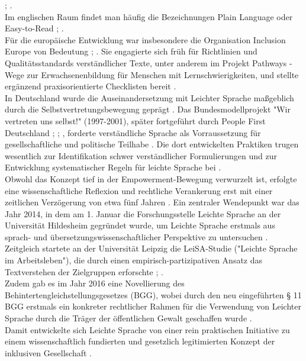 \cite[S. 251-252]{maas_handbuch_2018}; \cite[S. 18]{maas_leichte_2015}.\\
Im englischen Raum findet man häufig die Bezeichnungen Plain Language oder Easy-to-Read \cite[S. 251-252]{maas_handbuch_2018}; \cite{DINSPEC334292019}.\\
Für die europäische Entwicklung war insbesondere die Organisation Inclusion Europe von Bedeutung \cite[S. 252]{maas_handbuch_2018}; \cite[S. 18-19]{maas_leichte_2015}.
Sie engagierte sich früh für Richtlinien und Qualitätsstandards verständlicher Texte, unter anderem im Projekt Pathways - Wege zur Erwachsenenbildung für Menschen mit Lernschwierigkeiten, und stellte ergänzend praxisorientierte Checklisten bereit \cite[S. 18-20]{maas_leichte_2015}.\\
In Deutschland wurde die Auseinandersetzung mit Leichter Sprache maßgeblich durch die Selbstvertretungsbewegung geprägt \cite[S. 18-20]{maas_leichte_2015}.
Das Bundesmodellprojekt "Wir vertreten uns selbst!" (1997-2001), später fortgeführt durch People First Deutschland \cite[S. 18-20]{maas_leichte_2015}; \cite{menschzuerst_verein_2025}; \cite[S. 223]{maas_handbuch_2018}, forderte verständliche Sprache als Vorraussetzung für gesellschaftliche und politische Teilhabe \cite[S. 19-20]{maas_leichte_2015}.
Die dort entwickelten Praktiken trugen wesentlich zur Identifikation schwer verständlicher Formulierungen und zur Entwicklung systematischer Regeln für leichte Sprache bei \cite[S. 19-20]{maas_leichte_2015}.\\
Obwohl das Konzept tief in der Empowerment-Bewegung verwurzelt ist, erfolgte eine wissenschaftliche Reflexion und rechtliche Verankerung erst mit einer zeitlichen Verzögerung von etwa fünf Jahren \cite[S. 22]{maas_handbuch_2018}.
Ein zentraler Wendepunkt war das Jahr 2014, in dem am 1. Januar die Forschungsstelle Leichte Sprache an der Universität Hildesheim gegründet wurde, um Leichte Sprache erstmals aus sprach- und übersetzungswissenschaftlicher Perspektive zu untersuchen \cite[S. 278]{maas_handbuch_2018}.
Zeitgleich startete an der Universität Leipzig die LeiSA-Studie ("Leichte Sprache im Arbeitsleben"), die durch einen empirisch-partizipativen Ansatz das Textverstehen der Zielgruppen erforschte \cite{leisa_langfassung}; \cite[S. 259]{maas_handbuch_2018}.\\
Zudem gab es im Jahr 2016 eine Novellierung des Behintertengleichstellungsgesetzes (BGG), wobei durch den neu eingeführten § 11 BGG \cite{bgg_par11} erstmals ein konkreter rechtlicher Rahmen für die Verwendung von Leichter Sprache durch die Träger der öffentlichen Gewalt geschaffen wurde \cite[S. 82]{maas_handbuch_2018}.\\
Damit entwickelte sich Leichte Sprache von einer rein praktischen Initiative zu einem wissenschaftlich fundierten und gesetzlich legitimierten Konzept der inklusiven Gesellschaft \cite[S. 22]{maas_handbuch_2018}.

